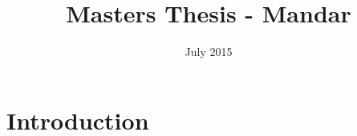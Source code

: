 \documentclass{article}
\title{Masters Thesis - Mandar}
\author{ }
\date{July 2015}
\begin{document}
\maketitle

\section{Introduction}
\end{document}
